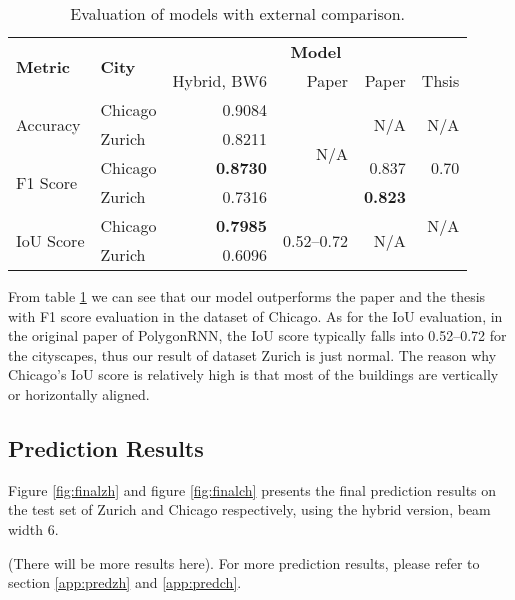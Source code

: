 \begin{table}[!h]
	\centering
	\caption[Evaluation of models with external comparison]{Evaluation of models with external comparison.}
	\label{tab:evalmodex}
	\begin{tabular}{l|l|r|r|r|r}
	\hline
	\multirow{2}{*}{\textbf{Metric}} & \multirow{2}{*}{\textbf{City}} & \multicolumn{4}{c}{\textbf{Model}} \\ \cline{3-6}
	 & & Hybrid, BW6\footnotemark[1] & Paper \cite{polygonrnn} & Paper \cite{mspascal} & Thsis \cite{msnadine} \\ \hline
	\multirow{2}{*}{Accuracy} & Chicago & 0.9084 & \multirow{4}{*}{N/A} & \multirow{2}{*}{N/A} & \multirow{2}{*}{N/A} \\ \cline{2-3}
	& Zurich & 0.8211 & & \\ \cline{1-3}\cline{5-6}
	\multirow{2}{*}{F1 Score} & Chicago & \textbf{0.8730} & & 0.837 & 0.70 \\ \cline{2-3}\cline{5-6}
	& Zurich & 0.7316 & & \textbf{0.823} & \multirow{3}{*}{N/A} \\ \cline{1-5}
	\multirow{2}{*}{IoU Score} & Chicago & \textbf{0.7985} & \multirow{2}{*}{0.52--0.72\footnotemark[2]} & \multirow{2}{*}{N/A} & \\ \cline{2-3}
	& Zurich & 0.6096 & & & \\
	\hline
\end{tabular}
\end{table}

From table \ref{tab:evalmodex} we can see that our model outperforms the paper \cite{mspascal} and the thesis \cite{msnadine} with F1 score evaluation in the dataset of Chicago. As for the IoU evaluation, in the original paper of PolygonRNN, the IoU score typically falls into 0.52--0.72 for the cityscapes, thus our result of dataset Zurich is just normal. The reason why Chicago’s IoU score is relatively high is that most of the buildings are vertically or horizontally aligned.

\subsection{Prediction Results}\label{predres}
Figure \ref{fig:finalzh} and figure \ref{fig:finalch} presents the final prediction results on the test set of Zurich and Chicago respectively, using the hybrid version, beam width 6.




(There will be more results here).
For more prediction results, please refer to section \ref{app:predzh} and \ref{app:predch}.


